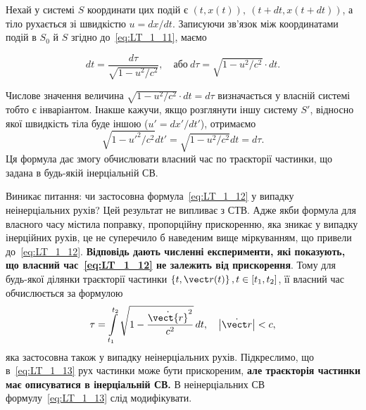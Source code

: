 Нехай у системі $S$ координати цих подій є $(t,x(t)),\ (t+dt,x(t+dt))$, а тіло рухається зі швидкістю $u=dx/dt$.
Записуючи зв'язок між координатами подій в $S_0$ й $S$ згідно до~\eqref{eq:LT_1_11}, маємо

\begin{equation*}
	dt=\frac{d\tau}{\sqrt{1-u^2/c^2}},\quad \text{або}\ d\tau =\sqrt{1-u^2/c^2}\cdot dt.
\end{equation*}

Числове значення величина $\sqrt{1-u^2/c^2}\cdot dt=d\tau $ визначається у власній системі тобто є інваріантом. Інакше
кажучи, якщо розглянути іншу систему $S'$, відносно якої швидкість тіла буде іншою ($u'=dx'/dt'$), отримаємо
\begin{equation} \label{eq:LT_1_12}
	\sqrt{1-u'^2/c^2}dt'=\sqrt{1-u^2/c^2}dt=d\tau .
\end{equation}
Ця формула дає змогу обчислювати власний час по траєкторії частинки, що задана в будь-якій інерціальній СВ.

Виникає питання: чи застосовна формула~\eqref{eq:LT_1_12} у випадку неінерціальних рухів? Цей результат не випливає з
СТВ. Адже якби формула для власного часу містила поправку, пропорційну прискоренню, яка зникає у випадку інерційних
рухів, це не суперечило б наведеним вище міркуванням, що привели до~\eqref{eq:LT_1_12}. \textbf{Відповідь дають численні
експерименти, які показують, що власний час~\eqref{eq:LT_1_12} не залежить від прискорення}. Тому для будь-якої ділянки
траєкторії частинки $\left\{t,{\vect r}(t)\right\}, t\in [t_1,t_2]$, її власний час обчислюється за формулою
\begin{equation}\label{eq:LT_1_13}
	\tau = \int\limits_{t_1}^{t_2}\sqrt{1-\frac{\dot{\vect{r}}^2}{c^2}}\,dt,\quad \left|\dot{\vect r}\right|<c,
\end{equation}
яка застосовна також у випадку неінерціальних рухів. Підкреслимо, що в~\eqref{eq:LT_1_13} рух частинки може бути
прискореним, \textbf{але траєкторія частинки має описуватися в інерціальній СВ.} В неінерціальних СВ
формулу~\eqref{eq:LT_1_13} слід модифікувати.


